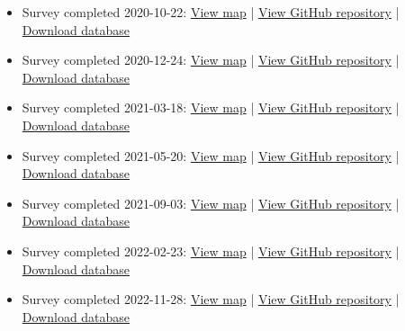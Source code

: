 \begin{refsection}
\begin{itemize}
\item Survey completed 2020-10-22: 
\href{(https://aubreymoore.github.io/new-crb-damage-map}{View map} | \href{https://github.com/aubreymoore/new-crb-damage-map}{View GitHub repository} | \href{https://github.com/aubreymoore/new-crb-damage-map/raw/main/original-map/Guam01.db}{Download database}

\item Survey completed 2020-12-24:
\href{https://aubreymoore.github.io/Guam-CRB-damage-map-2020-12/webmap/v1}{View map} | 
\href{https://github.com/aubreymoore/Guam-CRB-damage-map-2020-12)}{View GitHub repository} | 
\href{https://github.com/aubreymoore/Guam-CRB-damage-map-2020-12/raw/main/Guam02.db}{Download database}

\item Survey completed 2021-03-18: 
\href{https://aubreymoore.github.io/Guam-CRB-Damage-Map-2021-03}{View map} | 
\href{https://github.com/aubreymoore/Guam-CRB-damage-map-2021-03}{View GitHub repository} | 
\href{https://github.com/aubreymoore/Guam-CRB-Damage-Map-2021-03/blob/main/Guam03.zip}{Download database}

\item Survey completed 2021-05-20: 
\href{https://aubreymoore.github.io/Guam-CRB-Damage-Map-2021-05/webmap}{View map} | 
\href{https://github.com/aubreymoore/Guam-CRB-Damage-Map-2021-05}{View GitHub repository} | 
\href{https://github.com/aubreymoore/Guam-CRB-Damage-Map-2021-05/raw/main/Guam04.db}{Download database}

\item Survey completed 2021-09-03: 
\href{https://aubreymoore.github.io/Guam-CRB-Damage-Map-20021-09/webmap}{View map} | 
\href{https://github.com/aubreymoore/Guam-CRB-Damage-Map-20021-09}{View GitHub repository} | 
\href{https://github.com/aubreymoore/Guam-CRB-Damage-Map-20021-09/raw/main/crb-damage-2021-09.db}{Download database}

\item Survey completed 2022-02-23: 
\href{https://aubreymoore.github.io/Guam-CRB-Damage-Map-2022-02/webmap/#11/13.4483/144.7860}{View map} | 
\href{https://github.com/aubreymoore/Guam-CRB-Damage-Map-2022-02}{View GitHub repository} | 
\href{https://github.com/aubreymoore/Guam-CRB-Damage-Map-2022-02/raw/main/Guam-CRB-Damage-Map-2022-02.db}{Download database}

\item Survey completed 2022-11-28: 
\href{https://aubreymoore.github.io/Guam-CRB-Damage-Map-2022-11/webmap/#11/13.4483/144.7860}{View map} | 
\href{https://github.com/aubreymoore/Guam-CRB-Damage-Map-2022-11}{View GitHub repository} | 
\href{https://github.com/aubreymoore/Guam-CRB-Damage-Map-2022-11/raw/main/output/Guam07.db}{Download database}


\end{itemize}
\end{refsection}
